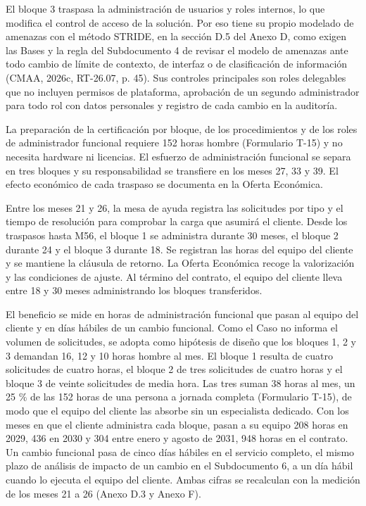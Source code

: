 \documentclass[subdoc]{../../comun/overfore}
\begin{document}
El bloque 3 traspasa la administración de usuarios y roles internos, lo que modifica el control de acceso de la solución. Por eso tiene su propio modelado de amenazas con el método STRIDE, en la sección D.5 del Anexo D, como exigen las Bases y la regla del Subdocumento 4 de revisar el modelo de amenazas ante todo cambio de límite de contexto, de interfaz o de clasificación de información (CMAA, 2026c, RT-26.07, p. 45). Sus controles principales son roles delegables que no incluyen permisos de plataforma, aprobación de un segundo administrador para todo rol con datos personales y registro de cada cambio en la auditoría.

La preparación de la certificación por bloque, de los procedimientos y de los roles de administrador funcional requiere 152 horas hombre (Formulario T-15) y no necesita hardware ni licencias. El esfuerzo de administración funcional se separa en tres bloques y su responsabilidad se transfiere en los meses 27, 33 y 39. El efecto económico de cada traspaso se documenta en la Oferta Económica.

Entre los meses 21 y 26, la mesa de ayuda registra las solicitudes por tipo y el tiempo de resolución para comprobar la carga que asumirá el cliente. Desde los traspasos hasta M56, el bloque 1 se administra durante 30 meses, el bloque 2 durante 24 y el bloque 3 durante 18. Se registran las horas del equipo del cliente y se mantiene la cláusula de retorno. La Oferta Económica recoge la valorización y las condiciones de ajuste. Al término del contrato, el equipo del cliente lleva entre 18 y 30 meses administrando los bloques transferidos.

El beneficio se mide en horas de administración funcional que pasan al equipo del cliente y en días hábiles de un cambio funcional. Como el Caso no informa el volumen de solicitudes, se adopta como hipótesis de diseño que los bloques 1, 2 y 3 demandan 16, 12 y 10 horas hombre al mes. El bloque 1 resulta de cuatro solicitudes de cuatro horas, el bloque 2 de tres solicitudes de cuatro horas y el bloque 3 de veinte solicitudes de media hora. Las tres suman 38 horas al mes, un 25 \% de las 152 horas de una persona a jornada completa (Formulario T-15), de modo que el equipo del cliente las absorbe sin un especialista dedicado. Con los meses en que el cliente administra cada bloque, pasan a su equipo 208 horas en 2029, 436 en 2030 y 304 entre enero y agosto de 2031, 948 horas en el contrato. Un cambio funcional pasa de cinco días hábiles en el servicio completo, el mismo plazo de análisis de impacto de un cambio en el Subdocumento 6, a un día hábil cuando lo ejecuta el equipo del cliente. Ambas cifras se recalculan con la medición de los meses 21 a 26 (Anexo D.3 y Anexo F).
\end{document}
